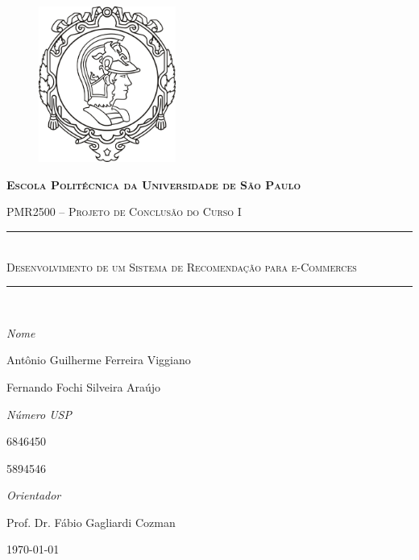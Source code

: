 \begin{center}
\begin{figure}[ht]
    \begin{center}
    \includegraphics[width=0.4\textwidth]{img/logo_poli}
    \end{center}
    \label{logo_poli}
\end{figure}
\begin{center}
\textbf{\textsc{Escola Politécnica da Universidade de São Paulo}}

\textsc{PMR2500 -- Projeto de Conclusão do Curso I}
\end{center}

\vspace{2cm}
\hrule  ~\\[0.5cm]
{ \huge \textsc{Desenvolvimento de um Sistema de Recomendação para e-Commerces}}\\[0.8cm]

\hrule  ~\\[0.5cm]

\end{center}


\vfill

\begin{minipage}{0.65\textwidth} 
	\large\emph{Nome} 
	
	\large{Antônio Guilherme Ferreira Viggiano}
		
	\large{Fernando Fochi Silveira Araújo}  

\end{minipage}
\begin{minipage}{0.35\textwidth} 
	\large\emph{Número USP}
	
	6846450
	
	5894546
\end{minipage}

\vfill

\begin{center}
	\large\emph{Orientador}

	\large{Prof. Dr. Fábio Gagliardi Cozman}
\end{center}

\vfill

\begin{center}
	\today
\end{center}
